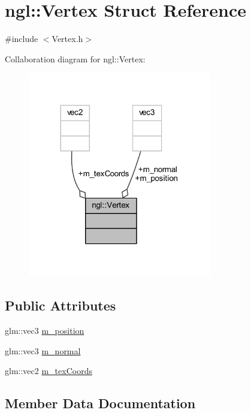 \hypertarget{structngl_1_1_vertex}{}\section{ngl\+:\+:Vertex Struct Reference}
\label{structngl_1_1_vertex}


{\ttfamily \#include $<$Vertex.\+h$>$}



Collaboration diagram for ngl\+:\+:Vertex\+:
\nopagebreak
\begin{figure}[H]
\begin{center}
\leavevmode
\includegraphics[width=227pt]{structngl_1_1_vertex__coll__graph}
\end{center}
\end{figure}
\subsection*{Public Attributes}
\begin{DoxyCompactItemize}
\item 
glm\+::vec3 \mbox{\hyperlink{structngl_1_1_vertex_a50eb7ca096a6a8653f5bf4165b0a2568}{m\+\_\+position}}
\item 
glm\+::vec3 \mbox{\hyperlink{structngl_1_1_vertex_a7c4c95a26b2b42fe6f630ee9449ec0ff}{m\+\_\+normal}}
\item 
glm\+::vec2 \mbox{\hyperlink{structngl_1_1_vertex_a0c05548e427728cba5daf4f952ab90de}{m\+\_\+tex\+Coords}}
\end{DoxyCompactItemize}


\subsection{Member Data Documentation}
\mbox{\label{structngl_1_1_vertex_a7c4c95a26b2b42fe6f630ee9449ec0ff}} 
